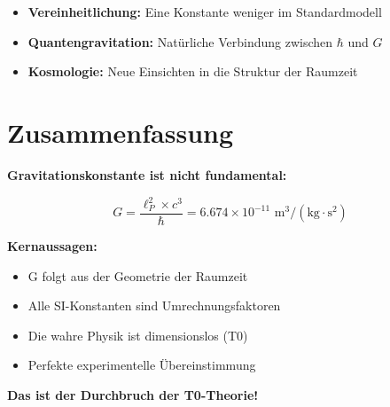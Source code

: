 \documentclass[12pt,a4paper]{article}
\theoremstyle{definition}
\begin{document}
	\begin{itemize}
		\item \textbf{Vereinheitlichung:} Eine Konstante weniger im Standardmodell
		\item \textbf{Quantengravitation:} Natürliche Verbindung zwischen $\hbar$ und $G$
		\item \textbf{Kosmologie:} Neue Einsichten in die Struktur der Raumzeit
	\end{itemize}
	
	\section{Zusammenfassung}
	
	\begin{formula}
		\textbf{Gravitationskonstante ist nicht fundamental:}
		
		\begin{equation}
			G = \frac{\ell_P^2 \times c^3}{\hbar} = 6.674 \times 10^{-11} \text{ m}^3/(\text{kg} \cdot \text{s}^2)
		\end{equation}
		
		\textbf{Kernaussagen:}
		\begin{itemize}
			\item G folgt aus der Geometrie der Raumzeit
			\item Alle SI-Konstanten sind Umrechnungsfaktoren
			\item Die wahre Physik ist dimensionslos (T0)
			\item Perfekte experimentelle Übereinstimmung
		\end{itemize}
		
		\textbf{Das ist der Durchbruch der T0-Theorie!}
	\end{formula}
	
	
	
	
\end{document}
